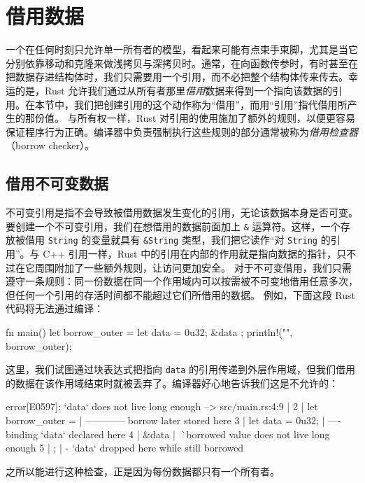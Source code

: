 \section{借用数据}
\label{idx:idx_b3c8ce76}
一个在任何时刻只允许单一所有者的模型，看起来可能有点束手束脚，尤其是当它分别依靠移动和克隆来做浅拷贝与深拷贝时。通常，在向函数传参时，有时甚至在把数据存进结构体时，我们只需要用一个引用，而不必把整个结构体传来传去。幸运的是，Rust 允许我们通过从所有者那里\emph{借用}数据来得到一个指向该数据的引用。在本节中，我们把创建引用的这个动作称为“借用”，而用“引用”指代借用所产生的那份值。
\label{idx:idx_d9e4d7c4}
\label{idx:idx_5daf4659}
与所有权一样，Rust 对引用的使用施加了额外的规则，以便更容易保证程序行为正确。编译器中负责强制执行这些规则的部分通常被称为\emph{借用检查器}（borrow checker）。
\subsection{借用不可变数据}
\label{idx:idx_db7b2b3c}
不可变引用是指不会导致被借用数据发生变化的引用，无论该数据本身是否可变。要创建一个不可变引用，我们在想借用的数据前面加上 \texttt{\&} 运算符。这样，一个存放被借用 \texttt{String} 的变量就具有 \texttt{\&String} 类型，我们把它读作“对 \texttt{String} 的引用”。与 C++ 引用一样，Rust 中的引用在内部的作用就是指向数据的指针，只不过在它周围附加了一些额外规则，让访问更加安全。
对于不可变借用，我们只需遵守一条规则：同一份数据在同一个作用域内可以按需被不可变地借用任意多次，但任何一个引用的存活时间都不能超过它们所借用的数据。
例如，下面这段 Rust 代码将无法通过编译：
\begin{codebox}[rust]
fn main() {
    let borrow_outer = {
        let data = 0u32;
        &data
    };
    println!("{}", borrow_outer);
}
\end{codebox}
这里，我们试图通过块表达式把指向 \texttt{data} 的引用传递到外层作用域，但我们借用的数据在该作用域结束时就被丢弃了。编译器好心地告诉我们这是不允许的：
\begin{codebox}[rust]
error[E0597]: `data` does not live long enough
 --> src/main.rs:4:9
  |
2 |     let borrow_outer = {
  |         ------------ borrow later stored here
3 |         let data = 0u32;
  |             ---- binding `data` declared here
4 |         &data
  |         ^^^^^ borrowed value does not live long enough
5 |     };
  |     - `data` dropped here while still borrowed
\end{codebox}
\label{idx:idx_79957e23}
之所以能进行这种检查，正是因为每份数据都只有一个所有者。
